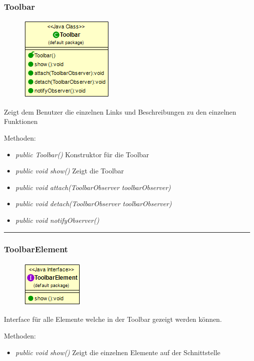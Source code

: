 \subsubsection{Toolbar}
\begin{minipage}{0.3\textwidth}
    \begin{figure}[H]
        {\centering\includegraphics[scale = 0.5
        ]{media/view/toolbar/Toolbar_Class.png}}
    \end{figure}
    \end{minipage} \hfill
    \begin{minipage}{0.6\textwidth}
Zeigt dem Benutzer die einzelnen Links und Beschreibungen zu den einzelnen Funktionen
\end{minipage}
Methoden: \begin{itemize} [noitemsep]
    \item \emph{public Toolbar()} Konstruktor für die Toolbar
    \item \emph{public void show()} Zeigt die Toolbar
    \item \emph{public void attach(ToolbarObserver toolbarObserver)}
    \item \emph{public void detach(ToolbarObserver toolbarObserver)}
    \item \emph{public void notifyObserver()}
\end{itemize}

\rule{\textwidth}{0.4pt}
\subsubsection{ToolbarElement}
\begin{minipage}{0.3\textwidth}
    \begin{figure}[H]
        {\centering\includegraphics[scale = 0.7
        ]{media/view/toolbar/ToolbarElement.png}}
    \end{figure}
    \end{minipage} \hfill
    \begin{minipage}{0.6\textwidth}
Interface für alle Elemente welche in der Toolbar gezeigt werden können.
\end{minipage}
Methoden: \begin{itemize} [noitemsep]
    \item \emph{public void show()} Zeigt die einzelnen Elemente auf der Schnittstelle
\end{itemize}

